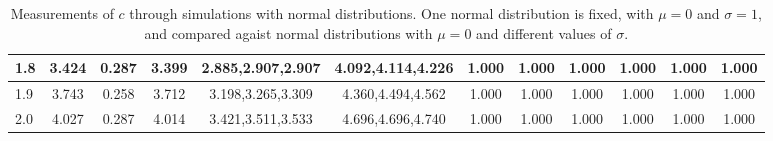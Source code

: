 \begin{table*}[h!]
\begin{center}
\begin{tabular}{| l | c | c | c | c | c | c | c | c | c | c | c |}
1.8 & 3.424 & 0.287 & 3.399 & 2.885,2.907,2.907 & 4.092,4.114,4.226  & 1.000  & 1.000  & 1.000  & 1.000  & 1.000  & 1.000 \\\hline
1.9 & 3.743 & 0.258 & 3.712 & 3.198,3.265,3.309 & 4.360,4.494,4.562  & 1.000  & 1.000  & 1.000  & 1.000  & 1.000  & 1.000 \\\hline
2.0 & 4.027 & 0.287 & 4.014 & 3.421,3.511,3.533 & 4.696,4.696,4.740  & 1.000  & 1.000  & 1.000  & 1.000  & 1.000  & 1.000 \\\hline
\end{tabular}
\caption{Measurements of $c$ through simulations
with normal distributions.
One normal distribution is fixed, with $\mu=0$ and $\sigma=1$,
and compared agaist normal distributions with $\mu=0$
and different values of $\sigma$.}
\end{center}
\end{table*}